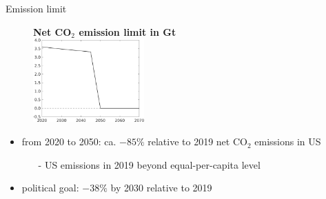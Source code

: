 \documentclass[11pt,aspectratio=169]{beamer}
\newcommand{\ar}{$\Rightarrow$ \ }
\begin{document}
\begin{frame}{Emission limit}
\vspace{-3mm}
\begin{center}
	\begin{figure}
		\centering
		\textbf{Net CO$_2$ emission limit in Gt}\\
		\vspace{2mm}	\includegraphics[width=0.38\textwidth]{../codding_model/own_basedOnFried/optimalPol_010922_revision/figures/all_13Sept22_Tplus30/Emnet.png}
	\end{figure}
\end{center}
\pause

\begin{itemize}
	\item<+-> from 2020 to 2050: ca. $-85\%$ relative to 2019 net CO$_2$ emissions in US
	\vspace{2mm}
	\begin{itemize}
		\item[-] US emissions in 2019 beyond equal-per-capita level
	\end{itemize}
	\vspace{2mm}
	\item<+-> political goal: $-38\%$ by 2030 relative to 2019
\end{itemize}
\end{frame}
\end{document}
